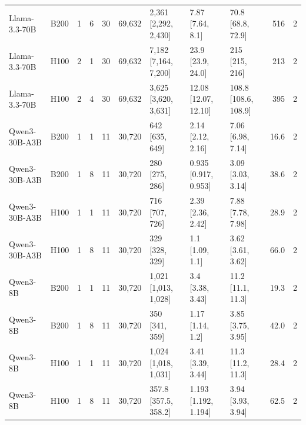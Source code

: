 \begin{landscape}
\begin{longtable}{llrrrrlllrr}
Llama-3.3-70B & B200 & 1 & 6 & 30 & 69,632 & 2,361 {[}2,292, 2,430{]} & 7.87 {[}7.64, 8.1{]} & 70.8 {[}68.8, 72.9{]} & 516 & 2 \\
Llama-3.3-70B & H100 & 2 & 1 & 30 & 69,632 & 7,182 {[}7,164, 7,200{]} & 23.9 {[}23.9, 24.0{]} & 215 {[}215, 216{]} & 213 & 2 \\
Llama-3.3-70B & H100 & 2 & 4 & 30 & 69,632 & 3,625 {[}3,620, 3,631{]} & 12.08 {[}12.07, 12.10{]} & 108.8 {[}108.6, 108.9{]} & 395 & 2 \\
Qwen3-30B-A3B & B200 & 1 & 1 & 11 & 30,720 & 642 {[}635, 649{]} & 2.14 {[}2.12, 2.16{]} & 7.06 {[}6.98, 7.14{]} & 16.6 & 2 \\
Qwen3-30B-A3B & B200 & 1 & 8 & 11 & 30,720 & 280 {[}275, 286{]} & 0.935 {[}0.917, 0.953{]} & 3.09 {[}3.03, 3.14{]} & 38.6 & 2 \\
Qwen3-30B-A3B & H100 & 1 & 1 & 11 & 30,720 & 716 {[}707, 726{]} & 2.39 {[}2.36, 2.42{]} & 7.88 {[}7.78, 7.98{]} & 28.9 & 2 \\
Qwen3-30B-A3B & H100 & 1 & 8 & 11 & 30,720 & 329 {[}328, 329{]} & 1.1 {[}1.09, 1.1{]} & 3.62 {[}3.61, 3.62{]} & 66.0 & 2 \\
Qwen3-8B & B200 & 1 & 1 & 11 & 30,720 & 1,021 {[}1,013, 1,028{]} & 3.4 {[}3.38, 3.43{]} & 11.2 {[}11.1, 11.3{]} & 19.3 & 2 \\
Qwen3-8B & B200 & 1 & 8 & 11 & 30,720 & 350 {[}341, 359{]} & 1.17 {[}1.14, 1.2{]} & 3.85 {[}3.75, 3.95{]} & 42.0 & 2 \\
Qwen3-8B & H100 & 1 & 1 & 11 & 30,720 & 1,024 {[}1,018, 1,031{]} & 3.41 {[}3.39, 3.44{]} & 11.3 {[}11.2, 11.3{]} & 28.4 & 2 \\
Qwen3-8B & H100 & 1 & 8 & 11 & 30,720 & 357.8 {[}357.5, 358.2{]} & 1.193 {[}1.192, 1.194{]} & 3.94 {[}3.93, 3.94{]} & 62.5 & 2 \\
\end{longtable}
\endgroup
\end{landscape}
\restoregeometry
